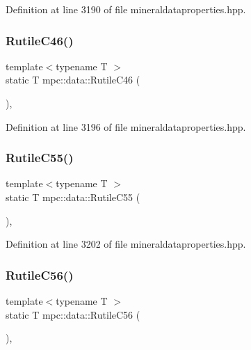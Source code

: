 Definition at line 3190 of file mineraldataproperties.\+hpp.

\mbox{\label{namespacempc_1_1data_a0bf3a2fccba3836ebfa989a7a3b9253e}} 
\subsubsection{\texorpdfstring{Rutile\+C46()}{RutileC46()}}
{\footnotesize\ttfamily template$<$typename T $>$ \\
static T mpc\+::data\+::\+Rutile\+C46 (\begin{DoxyParamCaption}{ }\end{DoxyParamCaption})\hspace{0.3cm}{\ttfamily [inline]}, {\ttfamily [static]}}



Definition at line 3196 of file mineraldataproperties.\+hpp.

\mbox{\label{namespacempc_1_1data_ab80b29a11309fa245e2cda8ca5c3f84b}} 
\subsubsection{\texorpdfstring{Rutile\+C55()}{RutileC55()}}
{\footnotesize\ttfamily template$<$typename T $>$ \\
static T mpc\+::data\+::\+Rutile\+C55 (\begin{DoxyParamCaption}{ }\end{DoxyParamCaption})\hspace{0.3cm}{\ttfamily [inline]}, {\ttfamily [static]}}



Definition at line 3202 of file mineraldataproperties.\+hpp.

\mbox{\label{namespacempc_1_1data_a59ba4d5824804f692a722b8655320224}} 
\subsubsection{\texorpdfstring{Rutile\+C56()}{RutileC56()}}
{\footnotesize\ttfamily template$<$typename T $>$ \\
static T mpc\+::data\+::\+Rutile\+C56 (\begin{DoxyParamCaption}{ }\end{DoxyParamCaption})\hspace{0.3cm}{\ttfamily [inline]}, {\ttfamily [static]}}




